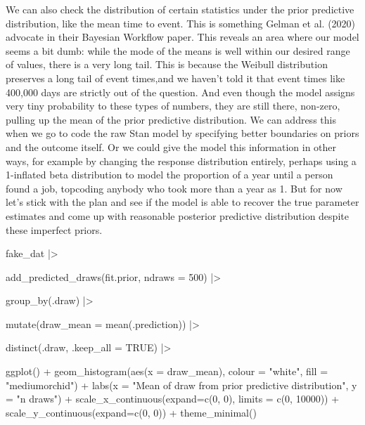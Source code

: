 \documentclass[
  letterpaper,
  DIV=11,
  numbers=noendperiod]{scrreprt}
\newenvironment{Shaded}{\begin{snugshade}}{\end{snugshade}}
\newcommand{\AttributeTok}[1]{\textcolor[rgb]{0.40,0.45,0.13}{#1}}
\newcommand{\ConstantTok}[1]{\textcolor[rgb]{0.56,0.35,0.01}{#1}}
\newcommand{\DecValTok}[1]{\textcolor[rgb]{0.68,0.00,0.00}{#1}}
\newcommand{\FunctionTok}[1]{\textcolor[rgb]{0.28,0.35,0.67}{#1}}
\newcommand{\NormalTok}[1]{\textcolor[rgb]{0.00,0.23,0.31}{#1}}
\newcommand{\SpecialCharTok}[1]{\textcolor[rgb]{0.37,0.37,0.37}{#1}}
\newcommand{\StringTok}[1]{\textcolor[rgb]{0.13,0.47,0.30}{#1}}
\begin{document}
We can also check the distribution of certain statistics under the prior
predictive distribution, like the mean time to event. This is something
Gelman et al. (2020) advocate in their Bayesian Workflow paper. This
reveals an area where our model seems a bit dumb: while the mode of the
means is well within our desired range of values, there is a very long
tail. This is because the Weibull distribution preserves a long tail of
event times,and we haven't told it that event times like 400,000 days
are strictly out of the question. And even though the model assigns very
tiny probability to these types of numbers, they are still there,
non-zero, pulling up the mean of the prior predictive distribution. We
can address this when we go to code the raw Stan model by specifying
better boundaries on priors and the outcome itself. Or we could give the
model this information in other ways, for example by changing the
response distribution entirely, perhaps using a 1-inflated beta
distribution to model the proportion of a year until a person found a
job, topcoding anybody who took more than a year as 1. But for now let's
stick with the plan and see if the model is able to recover the true
parameter estimates and come up with reasonable posterior predictive
distribution despite these imperfect priors.

\begin{Shaded}
\begin{Highlighting}[]
\NormalTok{fake\_dat }\SpecialCharTok{|\textgreater{}}
 
  \FunctionTok{add\_predicted\_draws}\NormalTok{(fit.prior, }\AttributeTok{ndraws =} \DecValTok{500}\NormalTok{) }\SpecialCharTok{|\textgreater{}}

  \FunctionTok{group\_by}\NormalTok{(.draw) }\SpecialCharTok{|\textgreater{}}

  \FunctionTok{mutate}\NormalTok{(}\AttributeTok{draw\_mean =} \FunctionTok{mean}\NormalTok{(.prediction)) }\SpecialCharTok{|\textgreater{}}

  \FunctionTok{distinct}\NormalTok{(.draw, }\AttributeTok{.keep\_all =} \ConstantTok{TRUE}\NormalTok{) }\SpecialCharTok{|\textgreater{}}

  \FunctionTok{ggplot}\NormalTok{() }\SpecialCharTok{+} 
  \FunctionTok{geom\_histogram}\NormalTok{(}\FunctionTok{aes}\NormalTok{(}\AttributeTok{x =}\NormalTok{ draw\_mean), }\AttributeTok{colour =} \StringTok{"white"}\NormalTok{, }\AttributeTok{fill =} \StringTok{"mediumorchid"}\NormalTok{) }\SpecialCharTok{+}
  \FunctionTok{labs}\NormalTok{(}\AttributeTok{x =} \StringTok{"Mean of draw from prior predictive distribution"}\NormalTok{, }\AttributeTok{y =} \StringTok{"n draws"}\NormalTok{) }\SpecialCharTok{+}
  \FunctionTok{scale\_x\_continuous}\NormalTok{(}\AttributeTok{expand=}\FunctionTok{c}\NormalTok{(}\DecValTok{0}\NormalTok{, }\DecValTok{0}\NormalTok{), }\AttributeTok{limits =} \FunctionTok{c}\NormalTok{(}\DecValTok{0}\NormalTok{, }\DecValTok{10000}\NormalTok{)) }\SpecialCharTok{+}
  \FunctionTok{scale\_y\_continuous}\NormalTok{(}\AttributeTok{expand=}\FunctionTok{c}\NormalTok{(}\DecValTok{0}\NormalTok{, }\DecValTok{0}\NormalTok{)) }\SpecialCharTok{+}
  \FunctionTok{theme\_minimal}\NormalTok{()}
\end{Highlighting}
\end{Shaded}
\end{document}
